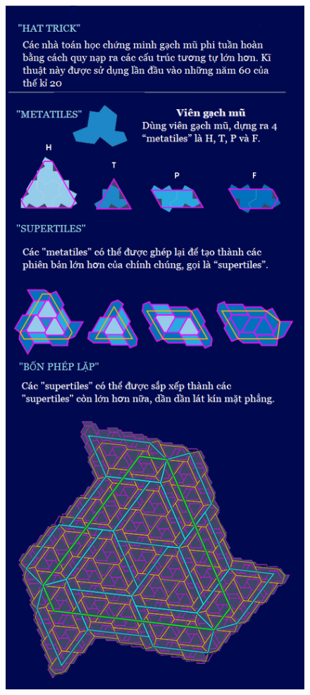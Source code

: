 \begin{multicols}{2}
	\begin{figure}[H]
		\vspace*{5pt}
		\centering
		\captionsetup{labelformat= empty, justification=centering}
		\includegraphics[width= 1\linewidth]{3}

\end{figure}
\end{multicols}
